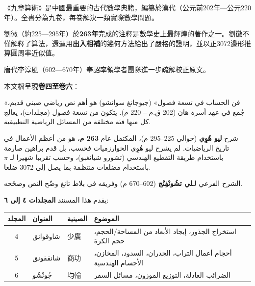 \documentclass[11pt,a4paper]{article}
\begin{document}
\noindent
\begin{minipage}[t]{0.48\textwidth}
《九章算術》是中國最重要的古代數學典籍，編纂於漢代（公元前202年—公元220年）。全書分為九卷，每卷解決一類實際數學問題。

劉徽（約225—295年）於\textbf{263年}完成的注釋是數學史上最輝煌的著作之一。劉徽不僅解釋了算法，還運用\textbf{出入相補}的幾何方法給出了嚴格的證明，並以正3072邊形推算圓周率近似值。

唐代李淳風（602—670年）奉詔率領學者團隊進一步疏解校正原文。

本文檔呈現\textbf{卷四至卷六}：
\end{minipage}
\hfill
\begin{minipage}[t]{0.48\textwidth}
\arabicfont\beginR
«فن الحساب في تسعة فصول» (جيوجانغ سوانشو) هو أهم نص رياضي صيني قديم، جُمع في عهد أسرة هان (202 ق.م -- 220 م). يتكون من تسعة فصول (مجلدات)، يعالج كل منها فئة مختلفة من المسائل الرياضية التطبيقية.

شرح \textbf{ليو هُوِي} (حوالي 225--295 م)، المكتمل عام \textbf{263 م}، هو من أعظم الأعمال في تاريخ الرياضيات. لم يشرح ليو هُوِي الخوارزميات فحسب، بل قدم براهين صارمة باستخدام طريقة التقطيع الهندسي (تشورو شيانغبو)، وحسب تقريبا شهيرا لـ $\pi$ باستخدام مضلعات منتظمة بما يصل إلى 3072 ضلعا.

الشرح الفرعي لـ\textbf{لي تشُونْفِنْج} (602--670 م) وفريقه في بلاط تانغ وضّح النص وصحّحه.

يقدم هذا المستند \textbf{المجلدات ٤ إلى ٦}:
\endR
\end{minipage}

\vspace{0.3cm}

\begin{center}
\begin{longtable}{|c|l|l|p{4.8cm}|}
\hline
\textbf{المجلد} & \textbf{العنوان} & \textbf{الصينية} & \textbf{الموضوع} \\
\hline
4 & شاوقوانق & 少廣 & استخراج الجذور، إيجاد الأبعاد من المساحة/الحجم، حجم الكرة \\
5 & شانققونق & 商功 & أحجام أعمال التراب، الجدران، السدود، المخازن، الأجسام الهندسية \\
6 & جُونْشُو & 均輸 & الضرائب العادلة، التوزيع الموزون، مسائل السفر \\
\hline
\end{longtable}
\end{center}

\vspace{0.3cm}
\end{document}
